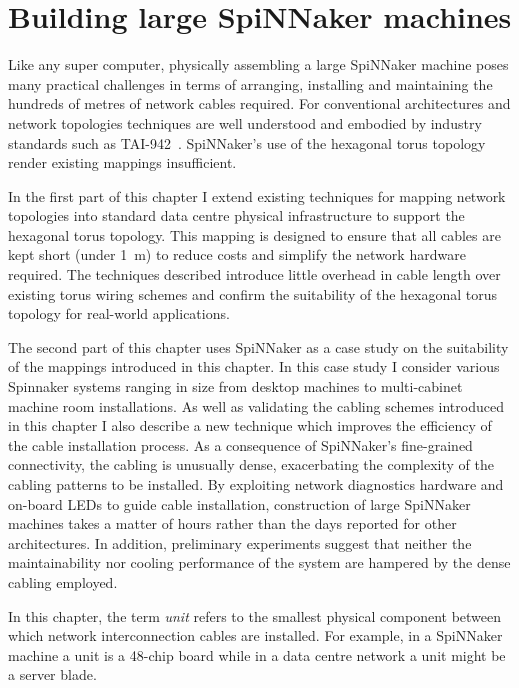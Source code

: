 \chapter{Building large SpiNNaker machines}
	
	\label{sec:building}
	
	Like any super computer, physically assembling a large SpiNNaker machine
	poses many practical challenges in terms of arranging, installing and
	maintaining the hundreds of metres of network cables required.  For
	conventional architectures and network topologies techniques are well
	understood and embodied by industry standards such as TAI-942~\cite{tia2006}.
	SpiNNaker's use of the hexagonal torus topology render existing mappings
	insufficient.
	
	In the first part of this chapter I extend existing techniques for mapping
	network topologies into standard data centre physical infrastructure to
	support the hexagonal torus topology. This mapping is designed to ensure that
	all cables are kept short (under \SI{1}{\meter}) to reduce costs and
	simplify the network hardware required. The techniques described introduce
	little overhead in cable length over existing torus wiring schemes
	and confirm the suitability of the hexagonal torus topology for real-world
	applications.
	
	The second part of this chapter uses SpiNNaker as a case study on the
	suitability of the mappings introduced in this chapter.  In this case study I
	consider various Spinnaker systems ranging in size from desktop machines to
	multi-cabinet machine room installations. As well as validating the cabling
	schemes introduced in this chapter I also describe a new technique which
	improves the efficiency of the cable installation process.  As a consequence
	of SpiNNaker's fine-grained connectivity, the cabling is unusually dense,
	exacerbating the complexity of the cabling patterns to be installed. By
	exploiting network diagnostics hardware and on-board LEDs to guide cable
	installation, construction of large SpiNNaker machines takes a matter of
	hours rather than the days reported for other architectures. In addition,
	preliminary experiments suggest that neither the maintainability nor cooling
	performance of the system are hampered by the dense cabling employed.
	
	In this chapter, the term \emph{unit} refers to the smallest physical
	component between which network interconnection cables are installed. For
	example, in a SpiNNaker machine a unit is a 48-chip board while in a data
	centre network a unit might be a server blade.
	
